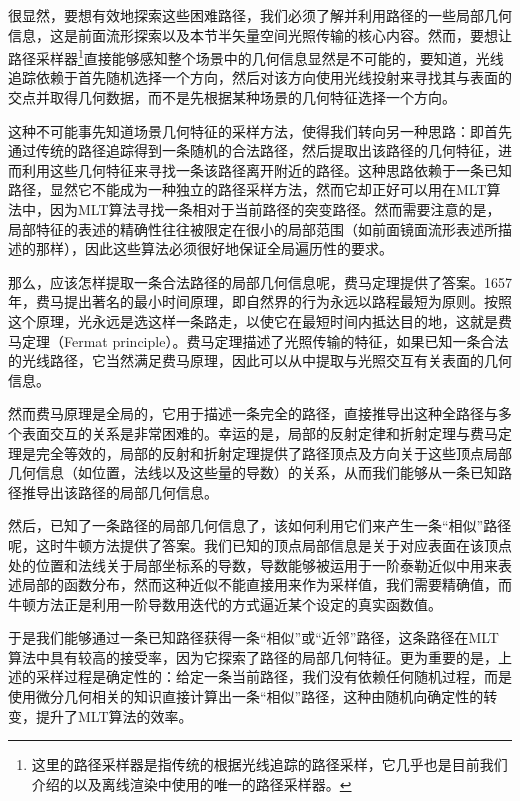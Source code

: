 很显然，要想有效地探索这些困难路径，我们必须了解并利用路径的一些局部几何信息，这是前面流形探索以及本节半矢量空间光照传输的核心内容。然而，要想让路径采样器\footnote{这里的路径采样器是指传统的根据光线追踪的路径采样，它几乎也是目前我们介绍的以及离线渲染中使用的唯一的路径采样器。}直接能够感知整个场景中的几何信息显然是不可能的，要知道，光线追踪依赖于首先随机选择一个方向，然后对该方向使用光线投射来寻找其与表面的交点并取得几何数据，而不是先根据某种场景的几何特征选择一个方向。

这种不可能事先知道场景几何特征的采样方法，使得我们转向另一种思路：即首先通过传统的路径追踪得到一条随机的合法路径，然后提取出该路径的几何特征，进而利用这些几何特征来寻找一条该路径离开附近的路径。这种思路依赖于一条已知路径，显然它不能成为一种独立的路径采样方法，然而它却正好可以用在MLT算法中，因为MLT算法寻找一条相对于当前路径的突变路径。然而需要注意的是，局部特征的表述的精确性往往被限定在很小的局部范围（如前面镜面流形表述所描述的那样），因此这些算法必须很好地保证全局遍历性的要求。

那么，应该怎样提取一条合法路径的局部几何信息呢，费马定理提供了答案。1657年，费马提出著名的最小时间原理，即自然界的行为永远以路程最短为原则。按照这个原理，光永远是选这样一条路走，以使它在最短时间内抵达目的地，这就是费马定理（Fermat principle）。费马定理描述了光照传输的特征，如果已知一条合法的光线路径，它当然满足费马原理，因此可以从中提取与光照交互有关表面的几何信息。

然而费马原理是全局的，它用于描述一条完全的路径，直接推导出这种全路径与多个表面交互的关系是非常困难的。幸运的是，局部的反射定律和折射定理与费马定理是完全等效的，局部的反射和折射定理提供了路径顶点及方向关于这些顶点局部几何信息（如位置，法线以及这些量的导数）的关系，从而我们能够从一条已知路径推导出该路径的局部几何信息。

然后，已知了一条路径的局部几何信息了，该如何利用它们来产生一条“相似”路径呢，这时牛顿方法提供了答案。我们已知的顶点局部信息是关于对应表面在该顶点处的位置和法线关于局部坐标系的导数，导数能够被运用于一阶泰勒近似中用来表述局部的函数分布，然而这种近似不能直接用来作为采样值，我们需要精确值，而牛顿方法正是利用一阶导数用迭代的方式逼近某个设定的真实函数值。

于是我们能够通过一条已知路径获得一条“相似”或“近邻”路径，这条路径在MLT算法中具有较高的接受率，因为它探索了路径的局部几何特征。更为重要的是，上述的采样过程是确定性的：给定一条当前路径，我们没有依赖任何随机过程，而是使用微分几何相关的知识直接计算出一条“相似”路径，这种由随机向确定性的转变，提升了MLT算法的效率。




